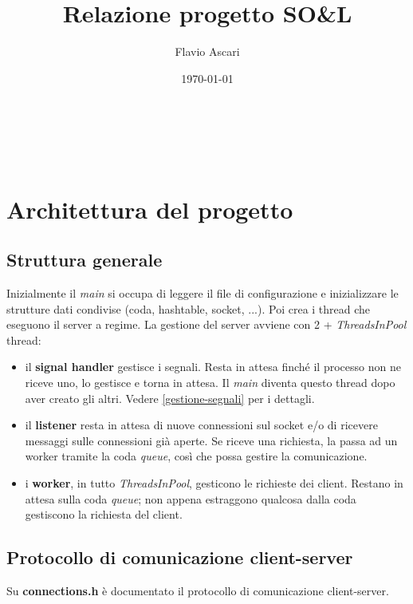 \documentclass[a4paper]{article}
\title{Relazione progetto SO\&L}\let\Title\@title
\author{Flavio Ascari}\let\Author\@author
\date{\today}\let\Date\@date
\theoremstyle{theorem}
\theoremstyle{remark}
\theoremstyle{definition}
\theoremstyle{corollary}
\theoremstyle{lemma}
\newcommand\file[1]{%
	\textbf{#1}}
\newcommand\codeName[1]{%
	\textit{#1}}
\begin{document}
\begin{center}
	\vspace*{0,5 cm}
	{\Huge \textsc{\Title}} \\
	\vspace{0,5 cm}
	\textsc{\Author} \
	\textsc{\Date}
	\thispagestyle{empty}
	\vspace{0,7 cm}
\end{center}
\small

\tableofcontents
\clearpage




\section{Architettura del progetto}
\subsection{Struttura generale}
Inizialmente il \codeName{main} si occupa di leggere il file di configurazione e inizializzare le strutture dati condivise (coda, hashtable, socket, ...). Poi crea i thread che eseguono il server a regime.
La gestione del server avviene con 2 + \codeName{ThreadsInPool} thread:
\begin{itemize}
	\item il \textbf{signal handler} gestisce i segnali. Resta in attesa finché il processo non ne riceve uno, lo gestisce e torna in attesa. Il \codeName{main} diventa questo thread dopo aver creato gli altri. Vedere \autoref{gestione-segnali} per i dettagli.
	\item il \textbf{listener} resta in attesa di nuove connessioni sul socket e/o di ricevere messaggi sulle connessioni già aperte. Se riceve una richiesta, la passa ad un worker tramite la coda \codeName{queue}, così che possa gestire la comunicazione.
	\item i \textbf{worker}, in tutto \codeName{ThreadsInPool}, gesticono le richieste dei client. Restano in attesa sulla coda \codeName{queue}; non appena estraggono qualcosa dalla coda gestiscono la richiesta del client.
\end{itemize}


\subsection{Protocollo di comunicazione client-server}\label{comunicazioni-client-server}
Su \file{connections.h} è documentato il protocollo di comunicazione client-server.
\end{document}

